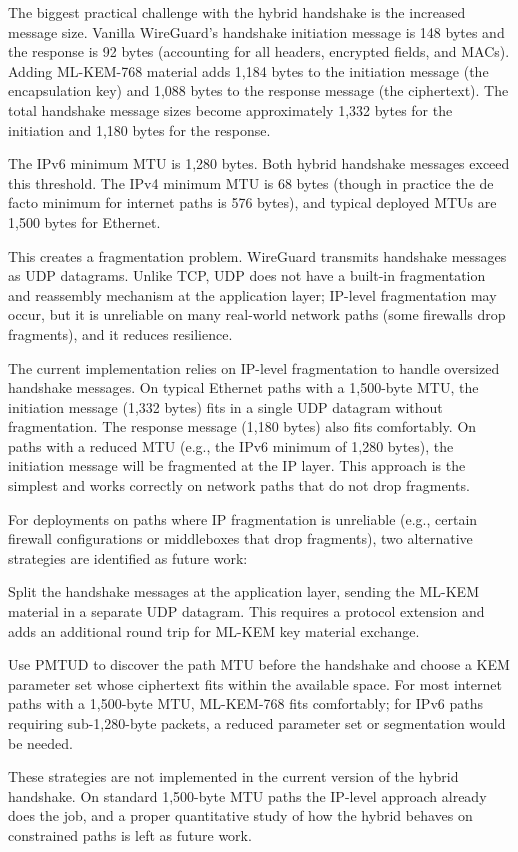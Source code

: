 The biggest practical challenge with the hybrid handshake is the increased message size. Vanilla WireGuard's handshake initiation message is 148 bytes and the response is 92 bytes (accounting for all headers, encrypted fields, and MACs). Adding ML-KEM-768 material adds 1,184 bytes to the initiation message (the encapsulation key) and 1,088 bytes to the response message (the ciphertext). The total handshake message sizes become approximately 1,332 bytes for the initiation and 1,180 bytes for the response.

The IPv6 minimum MTU is 1,280 bytes. Both hybrid handshake messages exceed this threshold. The IPv4 minimum MTU is 68 bytes (though in practice the de facto minimum for internet paths is 576 bytes), and typical deployed MTUs are 1,500 bytes for Ethernet.

This creates a fragmentation problem. WireGuard transmits handshake messages as UDP datagrams. Unlike TCP, UDP does not have a built-in fragmentation and reassembly mechanism at the application layer; IP-level fragmentation may occur, but it is unreliable on many real-world network paths (some firewalls drop fragments), and it reduces resilience.

The current implementation relies on IP-level fragmentation to handle oversized handshake messages. On typical Ethernet paths with a 1,500-byte MTU, the initiation message (1,332 bytes) fits in a single UDP datagram without fragmentation. The response message (1,180 bytes) also fits comfortably. On paths with a reduced MTU (e.g., the IPv6 minimum of 1,280 bytes), the initiation message will be fragmented at the IP layer. This approach is the simplest and works correctly on network paths that do not drop fragments.

For deployments on paths where IP fragmentation is unreliable (e.g., certain firewall configurations or middleboxes that drop fragments), two alternative strategies are identified as future work:

\begin{description}[style=nextline, leftmargin=0pt]
    \item[Application-Level Segmentation]
    Split the handshake messages at the application layer, sending the ML-KEM material in a separate UDP datagram. This requires a protocol extension and adds an additional round trip for ML-KEM key material exchange.

    \item[Path MTU Discovery with KEM Parameter Negotiation]
    Use PMTUD to discover the path MTU before the handshake and choose a KEM parameter set whose ciphertext fits within the available space. For most internet paths with a 1,500-byte MTU, ML-KEM-768 fits comfortably; for IPv6 paths requiring sub-1,280-byte packets, a reduced parameter set or segmentation would be needed.
\end{description}

These strategies are not implemented in the current version of the hybrid handshake. On standard 1,500-byte MTU paths the IP-level approach already does the job, and a proper quantitative study of how the hybrid behaves on constrained paths is left as future work.
